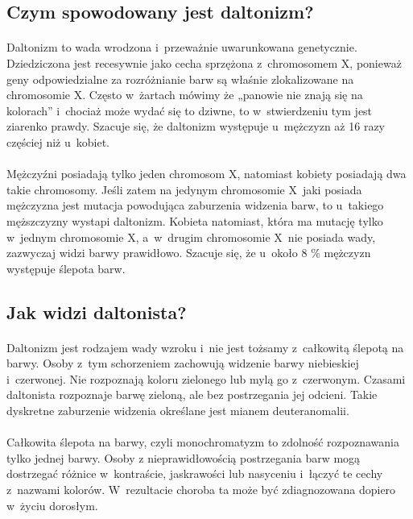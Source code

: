 \documentclass[12pt, letterpaper]{article}
\begin{document}
\subsection{Czym spowodowany jest daltonizm?}
\paragraph{}
Daltonizm to wada wrodzona i~przeważnie uwarunkowana genetycznie. Dziedziczona jest recesywnie jako cecha sprzężona z~chromosomem X, ponieważ geny odpowiedzialne za rozróżnianie barw są właśnie zlokalizowane na chromosomie X. Często w~żartach mówimy że „panowie nie znają się na kolorach” i~chociaż może wydać się to dziwne, to w~stwierdzeniu tym jest ziarenko prawdy. Szacuje się, że daltonizm występuje u~mężczyzn aż 16 razy częściej niż u~kobiet.
\paragraph{}
Mężczyźni posiadają tylko jeden chromosom X, natomiast kobiety posiadają dwa takie chromosomy. Jeśli zatem na jedynym chromosomie X~jaki posiada mężczyzna jest mutacja powodująca zaburzenia widzenia barw, to u~takiego męższczyzny wystapi daltonizm. Kobieta natomiast, która ma mutację tylko w~jednym chromosomie X, a~w~drugim chromosomie X~nie posiada wady, zazwyczaj widzi barwy prawidłowo. Szacuje się, że u~około 8 \% mężczyzn występuje ślepota barw.

\subsection{Jak widzi daltonista?}

\paragraph{}
Daltonizm jest rodzajem wady wzroku i~nie jest tożsamy z~całkowitą ślepotą na barwy. Osoby z~tym schorzeniem zachowują widzenie barwy niebieskiej i~czerwonej. Nie rozpoznają koloru zielonego lub mylą go z~czerwonym. Czasami daltonista rozpoznaje barwę zieloną, ale bez postrzegania jej odcieni. Takie dyskretne zaburzenie widzenia określane jest mianem deuteranomalii.

\paragraph{}
Całkowita ślepota na barwy, czyli monochromatyzm to zdolność rozpoznawania tylko jednej barwy. Osoby z nieprawidłowością postrzegania barw mogą dostrzegać różnice w~kontraście, jaskrawości lub nasyceniu i~łączyć te cechy z~nazwami kolorów. W~rezultacie choroba ta może być zdiagnozowana dopiero w~życiu dorosłym. 
\end{document}
